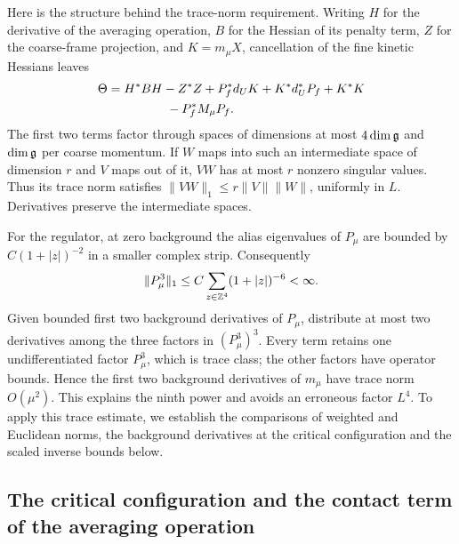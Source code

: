 Here is the structure behind the trace-norm requirement. Writing $H$
for the derivative of the averaging operation, $B$ for the Hessian of its penalty term, $Z$ for the
coarse-frame projection, and $K=m_\mu X$, cancellation of the fine
kinetic Hessians leaves
\begin{align}\label{ch07:theta}
 \Theta={}&H^*BH-Z^*Z+P_f^*d_UK+K^*d_U^*P_f+K^*K\\
 &\hspace{12mm}-P_f^*M_\mu P_f.\notag
\end{align}
The first two terms factor through spaces of dimensions at most
$4\dim\mathfrak g$ and $\dim\mathfrak g$ per coarse momentum. If $W$ maps into such an intermediate space of dimension $r$ and $V$
maps out of it, $VW$ has at most $r$ nonzero singular values. Thus its
trace norm satisfies $\|VW\|_1\le r\|V\|\|W\|$, uniformly in $L$.
Derivatives preserve the intermediate spaces.

For the regulator, at zero background the alias eigenvalues of $P_\mu$
are bounded by $C(1+|z|)^{-2}$ in a smaller complex strip. Consequently
\[
 \|P_\mu^3\|_1\le C\sum_{z\in\mathbb Z^4}(1+|z|)^{-6}<\infty.
\]
Given bounded first two background derivatives of $P_\mu$, distribute at most two
derivatives among the three factors in $(P_\mu^3)^3$. Every term retains
one undifferentiated factor $P_\mu^3$, which is trace class; the other factors have operator
bounds. Hence the first two background derivatives of $m_\mu$ have trace norm
$O(\mu^2)$. This explains the ninth power and avoids an erroneous
factor $L^4$. To apply this trace estimate, we establish the comparisons of weighted and Euclidean
norms, the background derivatives at the critical configuration and the scaled inverse bounds below.

\subsection{The critical configuration and the contact term of the averaging operation}
\label{ch07:contact}


